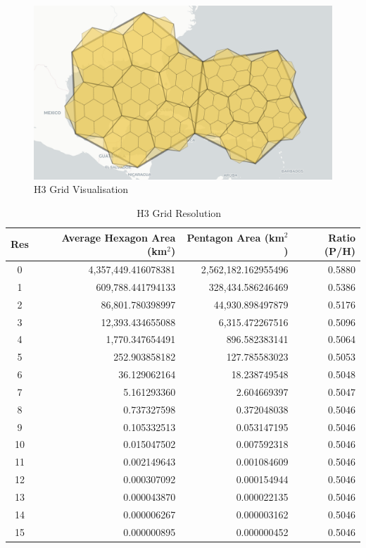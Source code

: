 \begin{figure}[h]
    \centering
    \includegraphics[width=\linewidth]{data/11.png}
    \caption{H3 Grid Visualisation ~\cite{H3Geo.}}
    \label{fig:H3Visualisation}
\end{figure}

\begin{table}[h]
\centering
\begin{tabular}{|c|r|r|r|}
\hline
\textbf{Res} & \textbf{Average Hexagon Area (km$^2$)} & \textbf{Pentagon Area (km$^2$)} & \textbf{Ratio (P/H)} \\
\hline
0 & 4,357,449.416078381 & 2,562,182.162955496 & 0.5880 \\
1 & 609,788.441794133 & 328,434.586246469 & 0.5386 \\
2 & 86,801.780398997 & 44,930.898497879 & 0.5176 \\
3 & 12,393.434655088 & 6,315.472267516 & 0.5096 \\
4 & 1,770.347654491 & 896.582383141 & 0.5064 \\
5 & 252.903858182 & 127.785583023 & 0.5053 \\
6 & 36.129062164 & 18.238749548 & 0.5048 \\
7 & 5.161293360 & 2.604669397 & 0.5047 \\
8 & 0.737327598 & 0.372048038 & 0.5046 \\
9 & 0.105332513 & 0.053147195 & 0.5046 \\
10 & 0.015047502 & 0.007592318 & 0.5046 \\
11 & 0.002149643 & 0.001084609 & 0.5046 \\
12 & 0.000307092 & 0.000154944 & 0.5046 \\
13 & 0.000043870 & 0.000022135 & 0.5046 \\
14 & 0.000006267 & 0.000003162 & 0.5046 \\
15 & 0.000000895 & 0.000000452 & 0.5046 \\
\hline
\end{tabular}
\caption{H3 Grid Resolution ~\cite{H3Geo.}}
\label{tab:resolutions}
\end{table}

